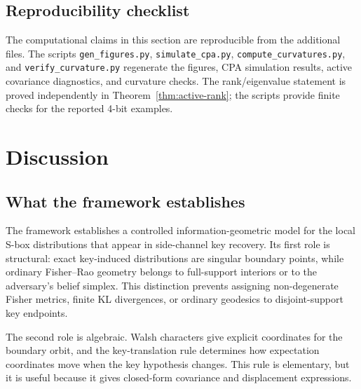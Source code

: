 \documentclass[referee,lineno,pdflatex,sn-mathphys-num]{sn-jnl}
\theoremstyle{thmstylethree}
\theoremstyle{thmstyletwo}
\theoremstyle{thmstyleone}
\begin{document}
\subsection{Reproducibility checklist}\label{subsec:repro-checklist}

The computational claims in this section are reproducible from the additional
files.  The scripts \texttt{gen\_figures.py}, \texttt{simulate\_cpa.py},
\texttt{compute\_curvatures.py}, and \texttt{verify\_curvature.py} regenerate
the figures, CPA simulation results, active covariance diagnostics, and
curvature checks.  The
rank/eigenvalue statement is proved independently in
Theorem~\ref{thm:active-rank}; the scripts provide finite checks for the
reported 4-bit examples.

\section{Discussion}\label{sec:discussion}

\subsection{What the framework establishes}

The framework establishes a controlled information-geometric model for the
local S-box distributions that appear in side-channel key recovery.  Its first
role is structural: exact key-induced distributions are singular boundary
points, while ordinary Fisher--Rao geometry belongs to full-support interiors
or to the adversary's belief simplex.  This distinction prevents assigning
non-degenerate Fisher metrics, finite KL divergences, or ordinary geodesics to
disjoint-support key endpoints.

The second role is algebraic.  Walsh characters give explicit coordinates for
the boundary orbit, and the key-translation rule determines how expectation
coordinates move when the key hypothesis changes.  This rule is elementary,
but it is useful because it gives closed-form covariance and displacement
expressions.
\end{document}

